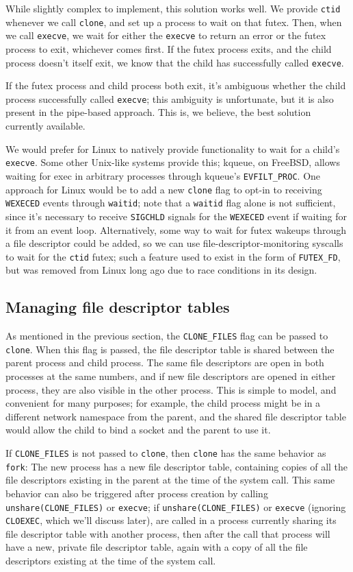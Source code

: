 \documentclass{acmart}
\begin{document}
While slightly complex to implement, this solution works well.
We provide \texttt{ctid} whenever we call \texttt{clone},
and set up a process to wait on that futex.
Then, when we call \texttt{execve},
we wait for either the \texttt{execve} to return an error or the futex process to exit,
whichever comes first.
If the futex process exits,
and the child process doesn't itself exit,
we know that the child has successfully called \texttt{execve}.

If the futex process and child process both exit,
it's ambiguous whether the child process successfully called \texttt{execve};
this ambiguity is unfortunate, but it is also present in the pipe-based approach.
This is, we believe, the best solution currently available.

We would prefer for Linux to natively provide functionality to wait for a child's \texttt{execve}.
Some other Unix-like systems provide this;
kqueue, on FreeBSD, allows waiting for exec in arbitrary processes through kqueue's \verb|EVFILT_PROC|.
One approach for Linux would be to add a new \texttt{clone} flag to opt-in to receiving \texttt{WEXECED} events through \texttt{waitid};
note that a \texttt{waitid} flag alone is not sufficient,
since it's necessary to receive \texttt{SIGCHLD} signals for the \texttt{WEXECED} event if waiting for it from an event loop.
Alternatively, some way to wait for futex wakeups through a file descriptor could be added,
so we can use file-descriptor-monitoring syscalls to wait for the \texttt{ctid} futex;
such a feature used to exist in the form of \verb|FUTEX_FD|,
but was removed from Linux long ago due to race conditions in its design.
\subsection{Managing file descriptor tables}\label{fdtables}
As mentioned in the previous section,
the \verb|CLONE_FILES| flag can be passed to \texttt{clone}.
When this flag is passed,
the file descriptor table is shared between the parent process and child process.
The same file descriptors are open in both processes at the same numbers,
and if new file descriptors are opened in either process,
they are also visible in the other process.
This is simple to model,
and convenient for many purposes;
for example, the child process might be in a different network namespace from the parent,
and the shared file descriptor table would allow the child to bind a socket
and the parent to use it.

If \verb|CLONE_FILES| is not passed to \texttt{clone},
then \texttt{clone} has the same behavior as \texttt{fork}:
The new process has a new file descriptor table,
containing copies of all the file descriptors existing in the parent at the time of the system call.
This same behavior can also be triggered after process creation by calling \verb|unshare(CLONE_FILES)| or \texttt{execve};
if \verb|unshare(CLONE_FILES)| or \texttt{execve} (ignoring \texttt{CLOEXEC}, which we'll discuss later),
are called in a process currently sharing its file descriptor table with another process,
then after the call that process will have a new, private file descriptor table,
again with a copy of all the file descriptors existing at the time of the system call.
\end{document}
